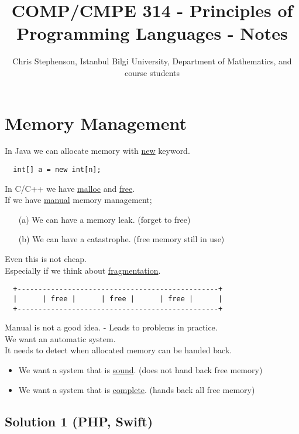 \documentclass{article}
\begin{document}
\title{COMP/CMPE 314 - Principles of Programming Languages - Notes}
\author{Chris Stephenson, Istanbul Bilgi University, Department of Mathematics, and course students}
\maketitle

\section*{Memory Management}
\begin{flushleft}
 In Java we can allocate memory with \underline{new} keyword.
 \begin{verbatim}
  int[] a = new int[n];
 \end{verbatim}
 In C/C++ we have \underline{malloc} and \underline{free}.\\
 \bigskip
 If we have \underline{manual} memory management;
 \begin{itemize}
  \item[(a)] We can have a memory leak. (forget to free)
  \item[(b)] We can have a catastrophe. (free memory still in use)
 \end{itemize}
 Even this is not cheap.\\
 Especially if we think about \underline{fragmentation}.
 \begin{verbatim}
  +------------------------------------------------+
  |      | free |      | free |      | free |      |
  +------------------------------------------------+
 \end{verbatim}
 Manual is not a good idea. - Leads to problems in practice.\\
 We want an automatic system.\\
 It needs to detect when allocated memory can be handed back.
 \begin{itemize}
  \item We want a system that is \underline{sound}. (does not hand back free memory)
  \item We want a system that is \underline{complete}. (hands back all free memory)
 \end{itemize}
\end{flushleft}

\subsection*{Solution 1 (PHP, Swift)}
\end{document}
